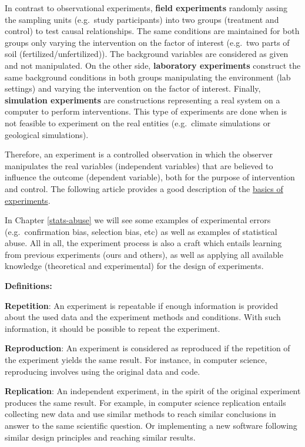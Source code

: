 \documentclass[
]{book}
\begin{document}
In contrast to observational experiments, \textbf{field experiments} randomly assing the sampling units (e.g.~study participants) into two groups (treatment and control) to test causal relationships. The same conditions are maintained for both groups only varying the intervention on the factor of interest (e.g.~two parts of soil (fertilized/unfertilized)). The background variables are considered as given and not manipulated. On the other side, \textbf{laboratory experiments} construct the same background conditions in both groups manipulating the environment (lab settings) and varying the intervention on the factor of interest. Finally, \textbf{simulation experiments} are constructions representing a real system on a computer to perform interventions. This type of experiments are done when is not feasible to experiment on the real entities (e.g.~climate simulations or geological simulations).

Therefore, an experiment is a controlled observation in which the observer manipulates the real variables (independent variables) that are believed to influence the outcome (dependent variable), both for the purpose of intervention and control. The following article provides a good description of the \href{https://opentextbc.ca/researchmethods/chapter/experiment-basics/}{basics of experiments}.

In Chapter \ref{stats-abuse} we will see some examples of experimental errors (e.g.~confirmation bias, selection bias, etc) as well as examples of statistical abuse. All in all, the experiment process is also a craft which entails learning from previous experiments (ours and others), as well as applying all available knowledge (theoretical and experimental) for the design of experiments.

\begin{tipbox}

\textbf{Definitions:}

\textbf{Repetition}: An experiment is repeatable if enough information is provided about the used data and the experiment methods and conditions. With such information, it should be possible to repeat the experiment.

\textbf{Reproduction}: An experiment is considered as reproduced if the repetition of the experiment yields the same result. For instance, in computer science, reproducing involves using the original data and code.

\textbf{Replication}: An independent experiment, in the spirit of the original experiment produces the same result. For example, in computer science replication entails collecting new data and use similar methods to reach similar conclusions in answer to the same scientific question. Or implementing a new software following similar design principles and reaching similar results.

\end{tipbox}
\end{document}
